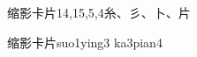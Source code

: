 \begin{entry}{缩影卡片}{14,15,5,4}{⽷、⼺、⼘、⽚}
  \begin{phonetics}{缩影卡片}{suo1ying3 ka3pian4}
  \end{phonetics}
\end{entry}
